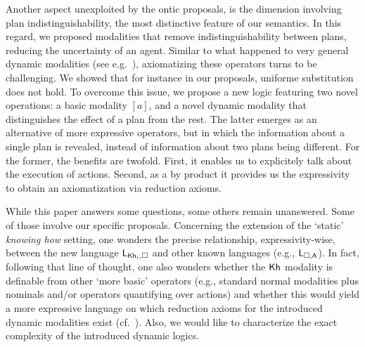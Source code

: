 Another aspect unexploited by the ontic proposals, is the dimension involving plan indistinguishability, the most distinctive feature of our semantics. In this regard, we proposed modalities that remove indistinguishability between plans, reducing the uncertainty of an agent. Similar to what happened to very general dynamic modalities (see e.g.~\cite{ArecesFH15}), axiomatizing these operators turns to be challenging. We showed that for instance in our proposals, uniforme substitution does not hold. To overcome this issue, we propose a new logic featuring two novel operations: a basic modality $[a]$, and a novel dynamic modality that distinguishes the effect of a plan from the rest. The latter emerges as an alternative of more expressive operators, but in which the information about a single plan is revealed, instead of information about two plans being different. For the former, the benefits are twofold. First, it enables us to explicitely talk about the execution of actions. Second, as a by product it provides us the expressivity to obtain an axiomatization via reduction axioms.

\begin{comment}
To the best of our knowledge, this is the first attempt to establish a theory of dynamic epistemic logics for knowing how. We argue that the semantics provided in~\cite{AFSVQ21,AFSVQ23report} is the crucial aspect for succeeding in this goal. Moreover, our work opens the path to study other dynamic operators in this context. For instance, we could define dynamic modalities based on action models, like those in~\cite{BaltagMS98,DELbook,GalimullinA22}. 
Also, it would be interesting to explore alternative techniques for obtaining proof systems without a general rule of substitution, for instance, by building a dynamic logic over a hybrid logic semantics (see e.g.~\cite{BenthemMZ2022}). Finally, we would like to characterize the exact complexity of the dynamic logics we introduced.
\end{comment}


While this paper answers some questions, some others remain unanswered. 
Some of those involve our specific proposals. 
Concerning the extension of the `static' \emph{knowing how} setting, one wonders the precise relationship, expressivity-wise, between the new language $\mathsf{L}_{{\sf Kh}_i,\square}$ and other known languages (e.g., $\mathsf{L}_{\square,{\sf A}}$). In fact, following that line of thought, one also wonders whether the ${\sf Kh}$ modality is definable from other `more basic' operators (e.g., standard normal modalities plus nominals and/or operators quantifying over actions) and whether this would yield a more expressive language on which reduction axioms for the introduced dynamic modalities exist (cf.~\cite{BenthemMZ2022}). Also, we would like to characterize the exact complexity of the introduced dynamic logics.

